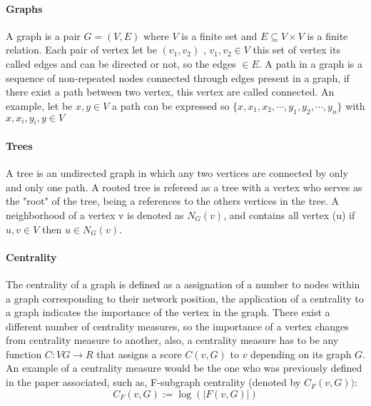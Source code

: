 

\paragraph{Graphs} A graph is a pair $G = (V, E)$ where $V$ is a finite set and $E \subseteq V\times V$ is a finite relation. Each pair of vertex let be $(v_{1},v_{2})$ , $v_{1},v_{2} \in V$ this set of vertex its called edges and can be directed or not, so the edges $\in E$. A path in a graph is a sequence of non-repeated nodes connected through edges present in a graph, if there exist a path between two vertex, this vertex are called connected. An example, let be $x,y \in V$ a path can be expressed so $\{x,x_{1},x_{2},\cdots,y_{1},y_{2},\cdots,y_{n} \}$ with $x,x_{i},y_{i},y \in V$

\paragraph{Trees} A tree is an undirected graph in which any two vertices are connected by only and only one path. A rooted tree is refereed as a tree with a vertex who serves as the "root" of the tree, being a references to the others  vertices in the tree. A neighborhood of a vertex v is denoted as $N_{G}(v)$, and contains all vertex (u) if ${u,v} \in V$ then $u \in N_{G}(v)$.

\paragraph{Centrality} The centrality of a graph is defined as a assignation of a number to nodes within a graph corresponding to their network position, the application of a centrality to a graph indicates the importance of the vertex in the graph. There exist a different number of centrality measures, so the importance of a vertex changes from centrality measure to another, also, a centrality measure has to be any function $C : VG \rightarrow R$ that assigns a score $C(v, G)$ to $v$ depending on its graph $G$. An example of a centrality measure would be the one who was previously defined in the paper associated, such as, F-subgraph
centrality (denoted by $C_{F} (v, G))$:
\begin{equation}
    C_{F} (v, G) := \log (|F(v, G)|)
\end{equation}


